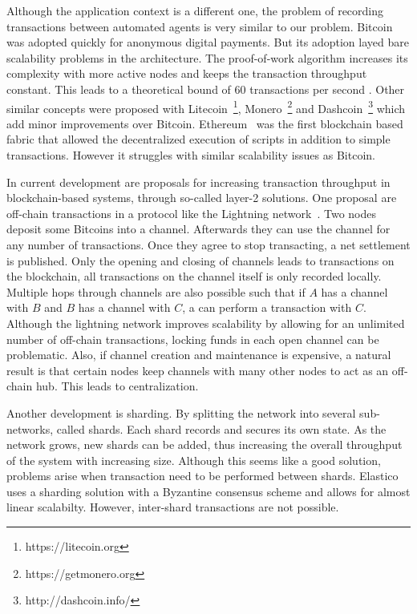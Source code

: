 Although the application context is a different one, the problem of recording transactions between
automated agents is very similar to our problem. Bitcoin was adopted quickly for anonymous digital 
payments. But its adoption layed bare scalability problems in the architecture. The proof-of-work
algorithm increases its complexity with more active nodes and keeps the transaction throughput 
constant. This leads to a theoretical bound of 60 transactions per second \cite{gervais2016security}. 
Other similar concepts were proposed with Litecoin~\footnote{https://litecoin.org}, Monero~\footnote{https://getmonero.org}
and Dashcoin~\footnote{http://dashcoin.info/} which add minor improvements over Bitcoin.
Ethereum~\cite{wood2014ethereum} was the first blockchain based fabric that allowed the decentralized
execution of scripts in addition to simple transactions. However it struggles with similar scalability
issues as Bitcoin.

In current development are proposals for increasing transaction throughput in blockchain-based 
systems, through so-called layer-2 solutions. One proposal are off-chain transactions in a protocol like the Lightning network~\cite{poon2016bitcoin}.
Two nodes deposit some Bitcoins into a channel. Afterwards they can use the channel for any number
of transactions. Once they agree to stop transacting, a net settlement is published. Only the 
opening and closing of channels leads to transactions on the blockchain, all transactions on the 
channel itself is only recorded locally. Multiple hops through channels are also possible such that 
if $A$ has a channel with $B$ and $B$ has a channel with $C$, a can perform a transaction with $C$. 
Although the lightning network improves scalability by allowing for an unlimited number of off-chain 
transactions, locking funds in each open channel can be problematic. Also, if channel creation and 
maintenance is expensive, a natural result is that certain nodes keep channels with many other 
nodes to act as an off-chain hub. This leads to centralization.

Another development is sharding. By splitting the network into several sub-networks, called shards.
Each shard records and secures its own state. As the network grows, new shards can be added, thus 
increasing the overall throughput of the system with increasing size. Although this seems like a 
good solution, problems arise when transaction need to be performed between shards. Elastico~\cite{luu2016secure}
uses a sharding solution with a Byzantine consensus scheme and allows for almost linear scalabilty.
However, inter-shard transactions are not possible.

